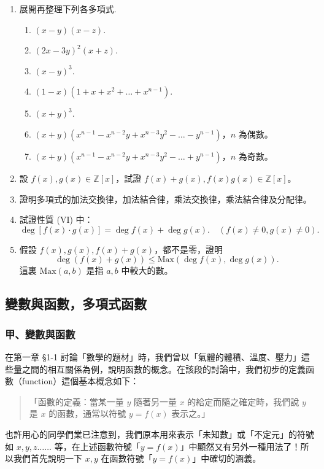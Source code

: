 \begin{enumerate}[1.]
  \item 展開再整理下列各多項式.
  \begin{enumerate}[(1)]
    \item $(x-y)(x-z)$.
    \item $(2x-3y)^2(x+z)$.
    \item $(x-y)^3$.
    \item $(1-x)(1+x+x^2+\dots+x^{n-1})$.
    \item $(x+y)^3$.\label{item:ex5-3-1-5}
    \item $(x+y)(x^{n-1}-x^{n-2}y+x^{n-3}y^2-\dots-y^{n-1})$，$n$ 為偶數。
    \item $(x+y)(x^{n-1}-x^{n-2}y+x^{n-3}y^2-\dots+y^{n-1})$，$n$ 為奇數。
  \end{enumerate}

  \item 設 $f(x), g(x) \in \mathbb{Z}[x]$，試證 $f(x)+g(x), f(x)g(x) \in \mathbb{Z}[x]$。

  \item 證明多項式的加法交換律，加法結合律，乘法交換律，乘法結合律及分配律。

  \item 試證性質 (VI) 中：
  \begin{equation*}
    \deg[f(x) \cdot g(x)] = \deg f(x) + \deg g(x). \quad (f(x) \neq 0, g(x) \neq 0).
  \end{equation*}

  \item 假設 $f(x), g(x), f(x)+g(x)$，都不是零，證明
  \begin{equation*}
    \deg(f(x)+g(x)) \le \text{Max}(\deg f(x), \deg g(x)).
  \end{equation*}
  這裏 $\text{Max}(a, b)$ 是指 $a, b$ 中較大的數。
\end{enumerate}

\subsection{變數與函數，多項式函數}\label{sec:5-3}

\subsubsection*{甲、變數與函數}\label{subsec:5-3-a}

在第一章 \S 1-1 討論「數學的題材」時，我們曾以「氣體的體積、溫度、壓力」這些量之間的相互關係為例，說明函數的概念。在該段的討論中，我們初步的定義函數（function）這個基本概念如下：
\begin{quote}
「函數的定義：當某一量 $y$ 隨著另一量 $x$ 的給定而隨之確定時，我們說 $y$ 是 $x$ 的函數，通常以符號 $y=f(x)$ 表示之。」
\end{quote}
也許用心的同學們業已注意到，我們原本用來表示「未知數」或「不定元」的符號如 $x, y, z \dots\dots$ 等，在上述函數符號「$y=f(x)$」中顯然又有另外一種用法了！所以我們首先說明一下 $x, y$ 在函數符號「$y=f(x)$」中確切的涵義。


